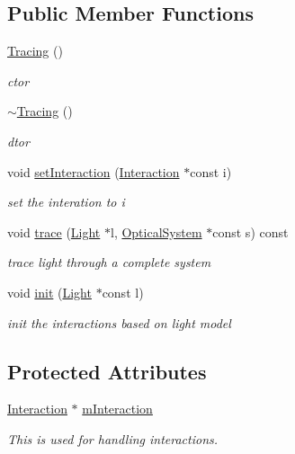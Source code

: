 \subsection*{Public Member Functions}
\begin{DoxyCompactItemize}
\item 
\hyperlink{classTracing_aa1207cbaf59ba3f2c200a80cd137b216}{Tracing} ()\hypertarget{classTracing_aa1207cbaf59ba3f2c200a80cd137b216}{}\label{classTracing_aa1207cbaf59ba3f2c200a80cd137b216}

\begin{DoxyCompactList}\small\item\em ctor \end{DoxyCompactList}\item 
\hyperlink{classTracing_a699e507b9d71ca86ff4759798f67a58b}{$\sim$\+Tracing} ()\hypertarget{classTracing_a699e507b9d71ca86ff4759798f67a58b}{}\label{classTracing_a699e507b9d71ca86ff4759798f67a58b}

\begin{DoxyCompactList}\small\item\em dtor \end{DoxyCompactList}\item 
void \hyperlink{classTracing_a0d1449364b93a2fab5d9a8f4a10f5a3a}{set\+Interaction} (\hyperlink{classInteraction}{Interaction} $\ast$const i)
\begin{DoxyCompactList}\small\item\em set the interation to i \end{DoxyCompactList}\item 
void \hyperlink{classTracing_aa347dfabff1a62e587004b671e570844}{trace} (\hyperlink{classLight}{Light} $\ast$l, \hyperlink{classOpticalSystem}{Optical\+System} $\ast$const s) const 
\begin{DoxyCompactList}\small\item\em trace light through a complete system \end{DoxyCompactList}\item 
void \hyperlink{classTracing_af01d7dd435e2ce61fdd0b3c56da8b001}{init} (\hyperlink{classLight}{Light} $\ast$const l)
\begin{DoxyCompactList}\small\item\em init the interactions based on light model \end{DoxyCompactList}\end{DoxyCompactItemize}
\subsection*{Protected Attributes}
\begin{DoxyCompactItemize}
\item 
\hyperlink{classInteraction}{Interaction} $\ast$ \hyperlink{classTracing_a5f7a022b92a31067dd44c908196bbc16}{m\+Interaction}\hypertarget{classTracing_a5f7a022b92a31067dd44c908196bbc16}{}\label{classTracing_a5f7a022b92a31067dd44c908196bbc16}

\begin{DoxyCompactList}\small\item\em This is used for handling interactions. \end{DoxyCompactList}\end{DoxyCompactItemize}


